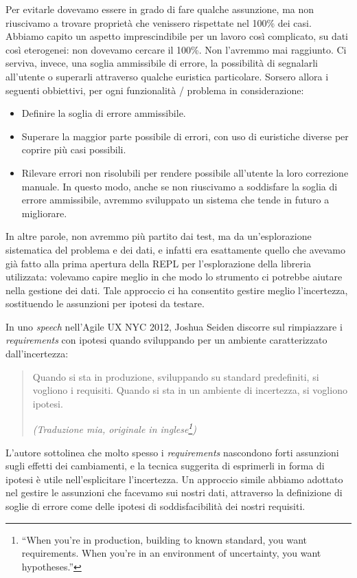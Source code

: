 \documentclass[12pt]{report}
\begin{document}
Per evitarle dovevamo essere in grado di fare qualche assunzione, ma
non riuscivamo a trovare proprietà che venissero rispettate nel 100\%
dei casi. Abbiamo capito un aspetto imprescindibile per un lavoro così
complicato, su dati così eterogenei: non dovevamo cercare il 100\%.
Non l'avremmo mai raggiunto. Ci serviva, invece, una soglia ammissibile di
errore, la possibilità di segnalarli all'utente o superarli attraverso qualche
euristica particolare. Sorsero allora i seguenti obbiettivi, per ogni
funzionalità / problema in considerazione: 

\begin{itemize}
  \item Definire la soglia di errore ammissibile.
  \item Superare la maggior parte possibile di errori, con uso di
euristiche diverse per coprire più casi possibili.
  \item Rilevare errori non risolubili per rendere possibile
all'utente la loro correzione manuale. In questo modo, anche se non
riuscivamo a soddisfare la soglia di errore ammissibile, avremmo
sviluppato un sistema che tende in futuro a migliorare.
\end{itemize}

In altre parole, non avremmo più partito dai test, ma da un'esplorazione
sistematica del problema e dei dati, e infatti era esattamente quello che
avevamo già fatto alla prima apertura della REPL per l'esplorazione della
libreria utilizzata: volevamo capire meglio in che modo lo strumento ci
potrebbe aiutare nella gestione dei dati. Tale approccio ci ha consentito
gestire meglio l'incertezza, sostituendo le assunzioni per ipotesi da testare.

In uno \textit{speech} nell'Agile UX NYC 2012, Joshua Seiden discorre
sul rimpiazzare i \textit{requirements} con ipotesi quando sviluppando
per un ambiente caratterizzato dall'incertezza: 

\begin{quote}
Quando si sta in produzione, sviluppando su standard predefiniti, si vogliono
i requisiti. Quando si sta in un ambiente di incertezza, si vogliono
ipotesi.\cite{seiden2012}

\flushright
\textit{(Traduzione mia, originale in inglese\footnote{
``When you're in production, building to known standard, you want requirements. 
When you're in an environment of uncertainty, you want hypotheses.''
})
}
\end{quote}

L'autore sottolinea che molto spesso i \textit{requirements}
nascondono forti assunzioni sugli effetti dei cambiamenti, e la
tecnica suggerita di esprimerli in forma di ipotesi è utile nell'esplicitare
l'incertezza. Un approccio simile abbiamo adottato nel gestire le assunzioni
che facevamo sui nostri dati, attraverso la definizione di soglie di errore
come delle ipotesi di soddisfacibilità dei nostri requisiti.
\end{document}
